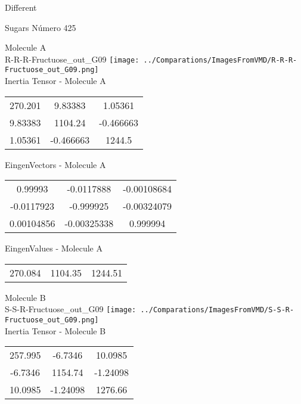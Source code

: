 \begin{center}
\vtab
\vtab
\textcolor{NavyBlue}{\Large Different}
\end{center}

 \newpage

\vtab[-2cm]
\begin{center}
{\large Sugars \tab Número 425}
\end{center}
\begin{multicols}{2}
\begin{center}

Molecule A \\ 
R-R-R-Fructuose\_out\_G09
\texttt{[image: ../Comparations/ImagesFromVMD/R-R-R-Fructuose\_out\_G09.png]}
\\
Inertia Tensor - Molecule A \\
\vtab

\begin{tabular}{|c c c|}
270.201	 & 	9.83383	 & 	1.05361	 \\
9.83383	 & 	1104.24	 & 	-0.466663	 \\
1.05361	 & 	-0.466663	 & 	1244.5
\end{tabular}

\vtab
 EingenVectors - Molecule A     \\
\vtab
\begin{tabular}{|c c c|}
0.99993	 & 	-0.0117888	 & 	-0.00108684	 \\
-0.0117923	 & 	-0.999925	 & 	-0.00324079	 \\
0.00104856	 & 	-0.00325338	 & 	0.999994
\end{tabular}

\vtab
 EingenValues - Molecule A     \\
\vtab
\begin{tabular}{|c c c|}
270.084	 & 	1104.35	 & 	1244.51	 \\
\end{tabular}
\columnbreak

Molecule B \\ 
S-S-R-Fructuose\_out\_G09
\texttt{[image: ../Comparations/ImagesFromVMD/S-S-R-Fructuose\_out\_G09.png]}
\\
Inertia Tensor - Molecule B \\
\vtab

\begin{tabular}{|c c c|}
257.995	 & 	-6.7346	 & 	10.0985	 \\
-6.7346	 & 	1154.74	 & 	-1.24098	 \\
10.0985	 & 	-1.24098	 & 	1276.66
\end{tabular}


\end{center}
\end{multicols}

